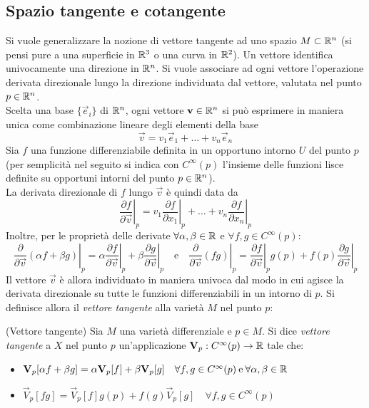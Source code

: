 \subsection{Spazio tangente e cotangente}
Si vuole generalizzare la nozione di vettore tangente ad uno spazio
$M \subset \mathbb{R}^n$ (si pensi pure a una superficie in $\mathbb{R}^3$
o una curva in $\mathbb{R}^2$). Un vettore identifica univocamente una direzione
in $\mathbb{R}^n$. Si vuole associare ad ogni vettore l'operazione derivata direzionale
lungo la direzione individuata dal vettore, valutata nel punto $p \in \mathbb{R}^n$.\\
Scelta una base $\{\vec e _i\}$ di $\mathbb{R}^n$, ogni vettore $\mathbf{v} \in \mathbb{R}^n$
si può esprimere in maniera unica come combinazione lineare degli elementi della base
$$ \vec v = v_1\vec e _1 + \dots + v_n\vec e _n $$
Sia $f$ una funzione differenziabile definita in un opportuno intorno $U$ del punto $p$
(per semplicità nel seguito si indica con $C^\infty(p)$ l'insieme delle funzioni lisce definite su
opportuni intorni del punto $p \in \mathbb{R}^n$).\\
La derivata direzionale di $f$ lungo $\vec v$ è quindi data da
   $$ \left. \frac{\partial f}{\partial \vec v} \right |_p =
         \left. v_1\frac{\partial f}{\partial x_1} \right |_p + \dots +
         \left. v_n\frac{\partial f}{\partial x_n} \right |_p $$
Inoltre, per le proprietà delle derivate $\forall \alpha,\beta \in \mathbb{R}$
e $\forall f,g \in C^\infty(p)$:
$$
      \left. \frac{\partial}{\partial \vec v}(\alpha f + \beta g) \right |_p
         = \alpha \left. \frac{\partial f}{\partial \vec v} \right |_p +
           \beta  \left. \frac{\partial g}{\partial \vec v} \right |_p
      \quad \mathrm{e} \quad
      \left. \frac{\partial}{\partial \vec v}(fg) \right |_p
         = \left. \frac{\partial f}{\partial \vec v} \right |_p g(p) +
           \left. f(p)\frac{\partial g}{\partial \vec v} \right |_p
$$
Il vettore $\vec v$ è allora individuato in maniera univoca dal modo in cui agisce
la derivata direzionale su tutte le funzioni differenziabili in un intorno di $p$.
Si definisce allora il \emph{vettore tangente} alla varietà $M$ nel punto $p$:
\begin{definition}{(Vettore tangente)}
      Sia $M$ una varietà differenziale e $p \in M$. Si dice \emph{vettore tangente}
      a $X$ nel punto $p$ un'applicazione $\mathbf{V} _p : C^\infty(p) \to \mathbb{R}$ tale che:
      \begin{itemize}
         \item $\mathbf{V} _p[\alpha f + \beta g] = \alpha \mathbf{V} _p[f] + \beta \mathbf{V}_p [g]
            \quad \forall f,g \in C^\infty(p) \mathrm{\:e\:} \forall \alpha,\beta \in \mathbb{R}$
         \item $\vec V _p [fg] = \vec V _p[f] g(p) + f(g)\vec V _p [g]
            \quad \forall f,g \in C^\infty(p)$
      \end{itemize}
\end{definition}
